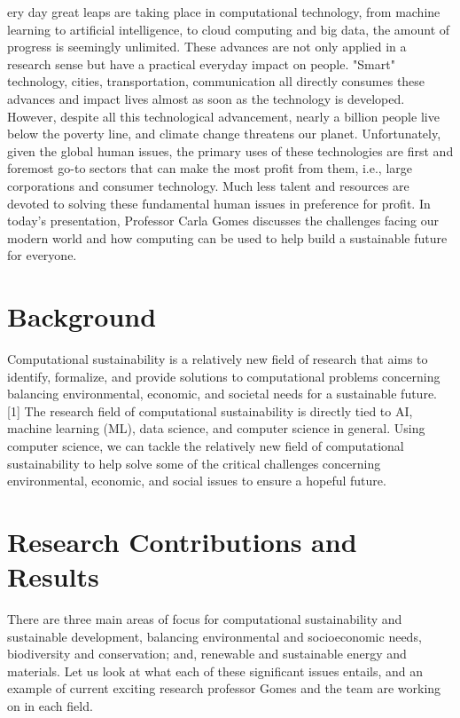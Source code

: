 \documentclass[journal,onecolumn]{IEEEtran}
\begin{document}
ery day great leaps are taking place in computational technology, from machine learning to artificial intelligence, to cloud computing and big data, the amount of progress is seemingly unlimited. 
These advances are not only applied in a research sense but have a practical everyday impact on people. "Smart" technology, cities, transportation, communication all directly consumes these advances and impact lives almost as soon as the technology is developed. 
However, despite all this technological advancement, nearly a billion people live below the poverty line, and climate change threatens our planet.
Unfortunately, given the global human issues, the primary uses of these technologies are first and foremost go-to sectors that can make the most profit from them, i.e., large corporations and consumer technology. 
Much less talent and resources are devoted to solving these fundamental human issues in preference for profit. 
In today's presentation, Professor Carla Gomes discusses the challenges facing our modern world and how computing can be used to help build a sustainable future for everyone. 

\section{Background}

Computational sustainability is a relatively new field of research that aims to identify, formalize, and provide solutions to computational problems concerning balancing environmental, economic, and societal needs for a sustainable future. [1] 
The research field of computational sustainability is directly tied to AI, machine learning (ML), data science, and computer science in general.
Using computer science, we can tackle the relatively new field of computational sustainability to help solve some of the critical challenges concerning environmental, economic, and social issues to ensure a hopeful future.

\section{Research Contributions and Results}

There are three main areas of focus for computational sustainability and sustainable development, balancing environmental and socioeconomic needs, biodiversity and conservation; and, renewable and sustainable energy and materials. 
Let us look at what each of these significant issues entails, and an example of current exciting research professor Gomes and the team are working on in each field.
\end{document}
